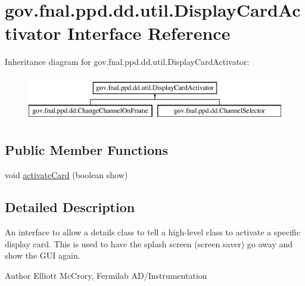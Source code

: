\hypertarget{interfacegov_1_1fnal_1_1ppd_1_1dd_1_1util_1_1DisplayCardActivator}{\section{gov.\-fnal.\-ppd.\-dd.\-util.\-Display\-Card\-Activator Interface Reference}
\label{interfacegov_1_1fnal_1_1ppd_1_1dd_1_1util_1_1DisplayCardActivator}
}
Inheritance diagram for gov.\-fnal.\-ppd.\-dd.\-util.\-Display\-Card\-Activator\-:\begin{figure}[H]
\begin{center}
\leavevmode
\includegraphics[height=2.000000cm]{interfacegov_1_1fnal_1_1ppd_1_1dd_1_1util_1_1DisplayCardActivator}
\end{center}
\end{figure}
\subsection*{Public Member Functions}
\begin{DoxyCompactItemize}
\item 
void \hyperlink{interfacegov_1_1fnal_1_1ppd_1_1dd_1_1util_1_1DisplayCardActivator_a6502375a378f23e57662be587ee75f02}{activate\-Card} (boolean show)
\end{DoxyCompactItemize}


\subsection{Detailed Description}
An interface to allow a details class to tell a high-\/level class to activate a specific display card. This is used to have the splash screen (screen saver) go away and show the G\-U\-I again.

\begin{DoxyAuthor}{Author}
Elliott Mc\-Crory, Fermilab A\-D/\-Instrumentation 
\end{DoxyAuthor}


